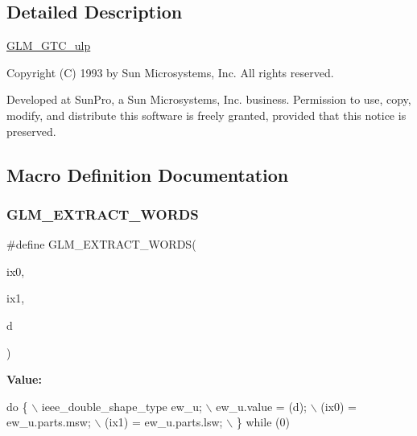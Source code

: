 \subsection{Detailed Description}
\hyperlink{group__gtc__ulp}{G\+L\+M\+\_\+\+G\+T\+C\+\_\+ulp}

Copyright (C) 1993 by Sun Microsystems, Inc. All rights reserved.

Developed at Sun\+Pro, a Sun Microsystems, Inc. business. Permission to use, copy, modify, and distribute this software is freely granted, provided that this notice is preserved. 

\subsection{Macro Definition Documentation}
\mbox{\label{ulp_8inl_a037d712bb7eec79dcd0073eb07d3f3e8}} 
\subsubsection{\texorpdfstring{G\+L\+M\+\_\+\+E\+X\+T\+R\+A\+C\+T\+\_\+\+W\+O\+R\+DS}{GLM\_EXTRACT\_WORDS}}
{\footnotesize\ttfamily \#define G\+L\+M\+\_\+\+E\+X\+T\+R\+A\+C\+T\+\_\+\+W\+O\+R\+DS(\begin{DoxyParamCaption}\item[{}]{ix0,  }\item[{}]{ix1,  }\item[{}]{d }\end{DoxyParamCaption})}

{\bfseries Value\+:}
\begin{DoxyCode}
\textcolor{keywordflow}{do} \{                                    \(\backslash\)
        ieee\_double\_shape\_type ew\_u;        \(\backslash\)
        ew\_u.value = (d);                   \(\backslash\)
        (ix0) = ew\_u.parts.msw;             \(\backslash\)
        (ix1) = ew\_u.parts.lsw;             \(\backslash\)
    \} \textcolor{keywordflow}{while} (0)
\end{DoxyCode}
\mbox{\label{ulp_8inl_a28d9056369280955e923f99180ccb23c}} 
